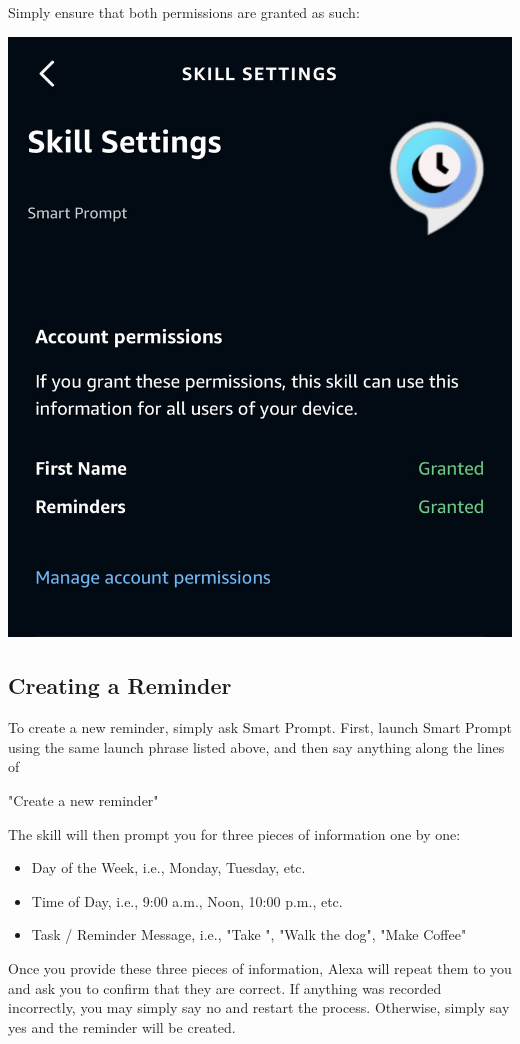 \documentclass[11pt, oneside]{article}
\begin{document}
Simply ensure that both permissions are granted as such:
\begin{center}
  \includegraphics[width=\linewidth * 1/2]{images/skillPermissions.jpg}
\end{center}

\subsection{Creating a Reminder}

To create a new reminder, simply ask Smart Prompt. First, launch Smart Prompt using the same launch phrase listed above, and then say anything along the lines of
\begin{center}
"Create a new reminder"
\end{center}
The skill will then prompt you for three pieces of information one by one:
\begin{itemize}
    \item Day of the Week, i.e., Monday, Tuesday, etc.
    \item Time of Day, i.e., 9:00 a.m., Noon, 10:00 p.m., etc.
    \item Task / Reminder Message, i.e., "Take ", "Walk the dog", "Make Coffee"
\end{itemize}
Once you provide these three pieces of information, Alexa will repeat them to you and ask you to confirm that they are correct. If anything was recorded incorrectly, you may simply say no and restart the process. Otherwise, simply say yes and the reminder will be created.
\end{document}
